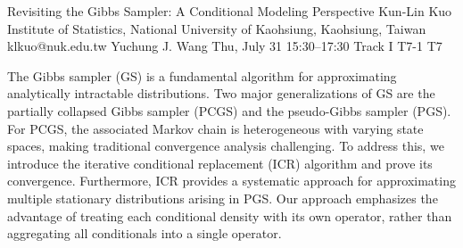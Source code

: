 \begin{talk}
  {Revisiting the Gibbs Sampler: A Conditional Modeling Perspective}%
  {Kun-Lin Kuo}%
  {Institute of Statistics, National University of Kaohsiung, Kaohsiung, Taiwan}%
  {klkuo@nuk.edu.tw}%
  {Yuchung J. Wang}%
  {}%
  {Thu, July 31 15:30–17:30 Track I}%
  {T7-1}%
  {T7}%
			
The Gibbs sampler (GS) is a fundamental algorithm for approximating analytically intractable distributions.
Two major generalizations of GS are the partially collapsed Gibbs sampler (PCGS) and the pseudo-Gibbs sampler (PGS). For PCGS, the associated Markov chain is heterogeneous with varying state spaces, making traditional convergence analysis challenging. To address this, we introduce the iterative conditional replacement (ICR) algorithm and prove its convergence. Furthermore, ICR provides a systematic approach for approximating multiple stationary distributions arising in PGS.
Our approach emphasizes the advantage of treating each conditional density with its own operator, rather than aggregating all conditionals into a single operator.

\medskip

\end{talk}
